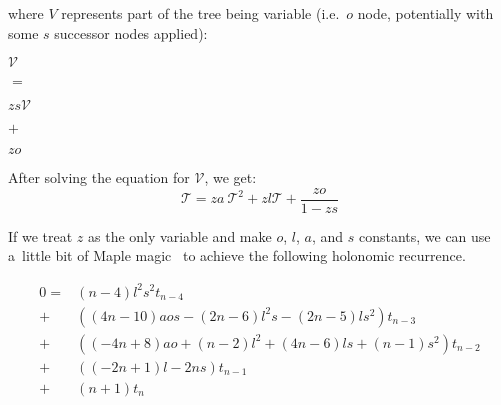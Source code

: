 \documentclass[final]{article}
\theoremstyle{definition}
\theoremstyle{definition}
\theoremstyle{remark}
\newcommand{\gf}[1]{\ensuremath{\mathcal{#1}}}
\begin{document}
where \(V\) represents part of the tree being variable (i.e.~\(o\) node, potentially with some \(s\) successor nodes applied):

\begin{center}
    \begin{minipage}[t]{.2\textwidth}
        \begin{center}
            \(\gf{V}\)\\
        \end{center}
    \end{minipage}%
    \begin{minipage}[t]{.05\textwidth}
        \begin{center}
            \(=\)\\
        \end{center}
    \end{minipage}%
    \begin{minipage}[t]{.2\textwidth}
        \begin{center}
            \(z s \gf{V}\)\\
        \end{center}
    \end{minipage}%
    \begin{minipage}[t]{.05\textwidth}
        \begin{center}
            \(+\)\\
        \end{center}
    \end{minipage}%
    \begin{minipage}[t]{.2\textwidth}
        \begin{center}
            \(z o\)\\
        \end{center}
    \end{minipage}%
\end{center}

After solving the equation for \(\gf{V}\), we get:
\[\gf{T} = z a~\gf{T}^2 + z l \gf{T} + \frac{z o}{1 - z s}\]

If we treat \(z\) as the only variable and make \(o\), \(l\), \(a\), and \(s\) constants, we can use a~little bit of Maple magic~\cite{gfun} to achieve the following holonomic recurrence.

\[\begin{array}{rl}
        0 =& (n - 4) l^2 s^2 t_{n - 4}\\
        +& ((4 n - 10) a o s - (2 n - 6) l^2 s - (2 n - 5) l s^2) t_{n - 3}\\
        +& ((-4 n + 8) a o + (n - 2) l^2 + (4 n - 6) l s + (n - 1) s^2) t_{n - 2}\\
        +& ((-2 n + 1) l - 2 n s) t_{n - 1}\\
        +& (n + 1) t_{n}
\end{array}\]
\end{document}
